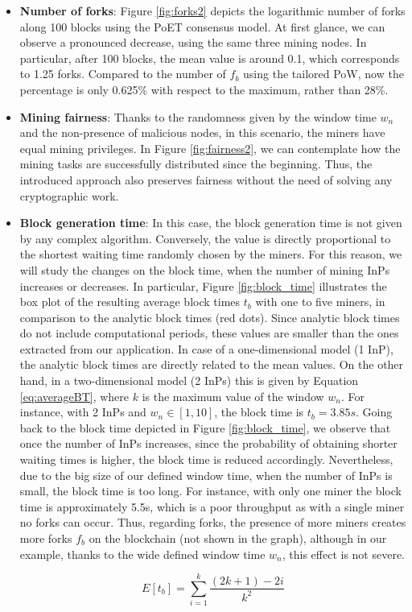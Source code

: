 \begin{itemize}
\item \textbf{Number of forks}: Figure \ref{fig:forks2} depicts the logarithmic number of forks along 100 blocks using the PoET consensus model. At first glance, we can observe a pronounced decrease, using the same three mining nodes. In particular, after 100 blocks, the mean value is around 0.1, which corresponds to 1.25 forks. Compared to the number of $f_b$ using the tailored PoW, now the percentage is only 0.625\% with respect to the maximum, rather than 28\%.
\item \textbf{Mining fairness}: Thanks to the randomness given by the window time $w_n$ and the non-presence of malicious nodes, in this scenario, the miners have equal mining privileges. In Figure \ref{fig:fairness2}, we can contemplate how the mining tasks are successfully distributed since the beginning. Thus, the introduced approach also preserves fairness without the need of solving any cryptographic work.
\item \textbf{Block generation time}: In this case, the block generation time is not given by any complex algorithm. Conversely, the value is directly proportional to the shortest waiting time randomly chosen by the miners. For this reason, we will study the changes on the block time, when the number of mining InPs increases or decreases. In particular, Figure \ref{fig:block_time} illustrates the box plot of the resulting average block times $t_b$ with one to five miners, in comparison to the analytic block times (red dots). Since analytic block times do not include computational periods, these values are smaller than the ones extracted from our application. In case of a one-dimensional model (1 InP), the analytic block times are directly related to the mean values. On the other hand, in a two-dimensional model (2 InPs) this is given by Equation \ref{eq:averageBT}, where $k$ is the maximum value of the window $w_n$. For instance, with 2 InPs and $w_n \in [1,10]$, the block time is $t_b = 3.85s$. Going back to the block time depicted in Figure \ref{fig:block_time}, we observe that once the number of InPs increases, since the probability of obtaining shorter waiting times is higher, the block time is reduced accordingly. Nevertheless, due to the big size of our defined window time, when the number of InPs is small, the block time is too long. For instance, with only one miner the block time is approximately 5.5s, which is a poor throughput as with a single miner no forks can occur. Thus, regarding forks, the presence of more miners creates more forks $f_b$ on the blockchain (not shown in the graph), although in our example, thanks to the wide defined window time $w_n$, this effect is not severe.

  \begin{equation} \label{eq:averageBT}
 E [t_b] = \sum_{i = 1}^{k} \frac{(2k + 1)-2i}{k^2}  
  \end{equation}
  
\end{itemize}

